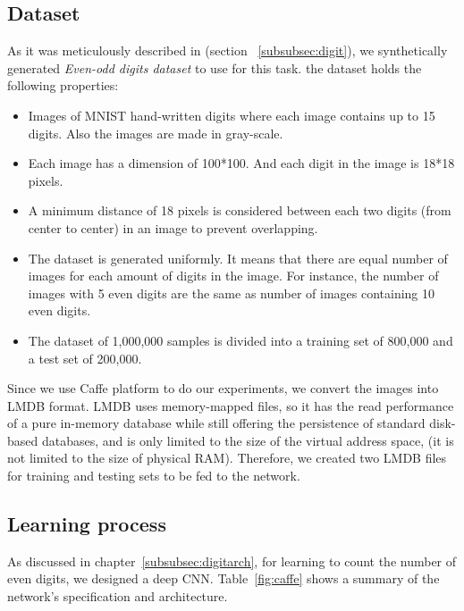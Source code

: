 \subsection{Dataset} 
As it was meticulously described in (section ~\ref{subsubsec:digit}), we synthetically generated \textit{Even-odd digits dataset} to use for this task. the dataset holds the following properties:
\begin{itemize}
\item Images of MNIST hand-written digits where each image contains up to 15 digits. Also the images are made in gray-scale.
\item Each image has a dimension of 100*100. And each digit in the image is 18*18 pixels.  
\item A minimum distance of 18 pixels is considered between each two digits (from center to center) in an image to prevent overlapping.
\item The dataset is generated uniformly. It means that there are equal number of images for each amount of digits in the image. For instance, the number of images with 5 even digits are the same as number of images containing 10 even digits.
\item The dataset of 1,000,000 samples is divided into a training set of 800,000 and a test set of 200,000. 
\end{itemize}

Since we use Caffe platform to do our experiments, we convert the images into LMDB format. LMDB uses memory-mapped files, so it has the read performance of a pure in-memory database while still offering the persistence of standard disk-based databases, and is only limited to the size of the virtual address space, (it is not limited to the size of physical RAM). Therefore, we created two LMDB files for training and testing sets to be fed to the network.  

\subsection{Learning process}

As discussed in chapter~\ref{subsubsec:digitarch}, for learning to count the number of even digits, we designed a deep CNN. Table~\ref{fig:caffe} shows a summary of the network's specification and architecture.

